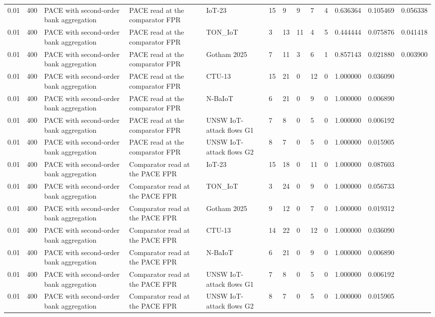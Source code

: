 \begin{tabular}{lllllllllllll}
0.01 & 400 & PACE with second-order bank aggregation & PACE read at the comparator FPR & IoT-23 & 15 & 9 & 9 & 7 & 4 & 0.636364 & 0.105469 & 0.056338 \\
0.01 & 400 & PACE with second-order bank aggregation & PACE read at the comparator FPR & TON\_IoT & 3 & 13 & 11 & 4 & 5 & 0.444444 & 0.075876 & 0.041418 \\
0.01 & 400 & PACE with second-order bank aggregation & PACE read at the comparator FPR & Gotham 2025 & 7 & 11 & 3 & 6 & 1 & 0.857143 & 0.021880 & 0.003900 \\
0.01 & 400 & PACE with second-order bank aggregation & PACE read at the comparator FPR & CTU-13 & 15 & 21 & 0 & 12 & 0 & 1.000000 & 0.036090 &  \\
0.01 & 400 & PACE with second-order bank aggregation & PACE read at the comparator FPR & N-BaIoT & 6 & 21 & 0 & 9 & 0 & 1.000000 & 0.006890 &  \\
0.01 & 400 & PACE with second-order bank aggregation & PACE read at the comparator FPR & UNSW IoT-attack flows G1 & 7 & 8 & 0 & 5 & 0 & 1.000000 & 0.006192 &  \\
0.01 & 400 & PACE with second-order bank aggregation & PACE read at the comparator FPR & UNSW IoT-attack flows G2 & 8 & 7 & 0 & 5 & 0 & 1.000000 & 0.015905 &  \\
0.01 & 400 & PACE with second-order bank aggregation & Comparator read at the PACE FPR & IoT-23 & 15 & 18 & 0 & 11 & 0 & 1.000000 & 0.087603 &  \\
0.01 & 400 & PACE with second-order bank aggregation & Comparator read at the PACE FPR & TON\_IoT & 3 & 24 & 0 & 9 & 0 & 1.000000 & 0.056733 &  \\
0.01 & 400 & PACE with second-order bank aggregation & Comparator read at the PACE FPR & Gotham 2025 & 9 & 12 & 0 & 7 & 0 & 1.000000 & 0.019312 &  \\
0.01 & 400 & PACE with second-order bank aggregation & Comparator read at the PACE FPR & CTU-13 & 14 & 22 & 0 & 12 & 0 & 1.000000 & 0.036090 &  \\
0.01 & 400 & PACE with second-order bank aggregation & Comparator read at the PACE FPR & N-BaIoT & 6 & 21 & 0 & 9 & 0 & 1.000000 & 0.006890 &  \\
0.01 & 400 & PACE with second-order bank aggregation & Comparator read at the PACE FPR & UNSW IoT-attack flows G1 & 7 & 8 & 0 & 5 & 0 & 1.000000 & 0.006192 &  \\
0.01 & 400 & PACE with second-order bank aggregation & Comparator read at the PACE FPR & UNSW IoT-attack flows G2 & 8 & 7 & 0 & 5 & 0 & 1.000000 & 0.015905 &  \\

\end{tabular}
